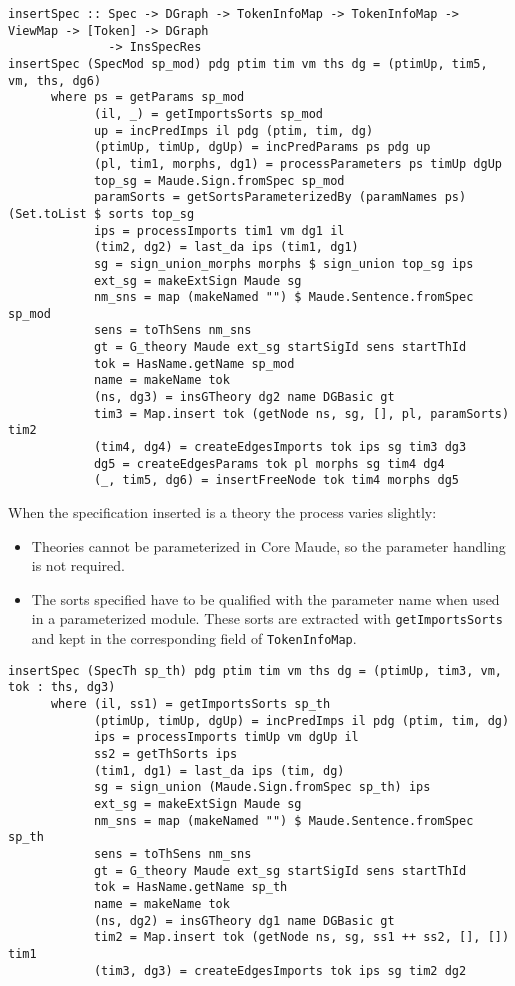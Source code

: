 {\codesize
\begin{verbatim}
insertSpec :: Spec -> DGraph -> TokenInfoMap -> TokenInfoMap -> ViewMap -> [Token] -> DGraph
              -> InsSpecRes
insertSpec (SpecMod sp_mod) pdg ptim tim vm ths dg = (ptimUp, tim5, vm, ths, dg6)
      where ps = getParams sp_mod
            (il, _) = getImportsSorts sp_mod
            up = incPredImps il pdg (ptim, tim, dg)
            (ptimUp, timUp, dgUp) = incPredParams ps pdg up
            (pl, tim1, morphs, dg1) = processParameters ps timUp dgUp
            top_sg = Maude.Sign.fromSpec sp_mod
            paramSorts = getSortsParameterizedBy (paramNames ps) (Set.toList $ sorts top_sg
            ips = processImports tim1 vm dg1 il
            (tim2, dg2) = last_da ips (tim1, dg1)
            sg = sign_union_morphs morphs $ sign_union top_sg ips
            ext_sg = makeExtSign Maude sg
            nm_sns = map (makeNamed "") $ Maude.Sentence.fromSpec sp_mod
            sens = toThSens nm_sns
            gt = G_theory Maude ext_sg startSigId sens startThId
            tok = HasName.getName sp_mod
            name = makeName tok
            (ns, dg3) = insGTheory dg2 name DGBasic gt
            tim3 = Map.insert tok (getNode ns, sg, [], pl, paramSorts) tim2
            (tim4, dg4) = createEdgesImports tok ips sg tim3 dg3
            dg5 = createEdgesParams tok pl morphs sg tim4 dg4
            (_, tim5, dg6) = insertFreeNode tok tim4 morphs dg5
\end{verbatim}
}

When the specification inserted is a theory the process varies slightly:

\begin{itemize}
\item Theories cannot be parameterized in Core Maude, so the parameter
handling is not required.
\item The sorts specified have to be qualified with the parameter
name when used in a parameterized module. These sorts are extracted
with \verb"getImportsSorts" and kept in the corresponding field of
\verb"TokenInfoMap".
\end{itemize}

{\codesize
\begin{verbatim}
insertSpec (SpecTh sp_th) pdg ptim tim vm ths dg = (ptimUp, tim3, vm, tok : ths, dg3)
      where (il, ss1) = getImportsSorts sp_th
            (ptimUp, timUp, dgUp) = incPredImps il pdg (ptim, tim, dg)
            ips = processImports timUp vm dgUp il
            ss2 = getThSorts ips
            (tim1, dg1) = last_da ips (tim, dg)
            sg = sign_union (Maude.Sign.fromSpec sp_th) ips
            ext_sg = makeExtSign Maude sg
            nm_sns = map (makeNamed "") $ Maude.Sentence.fromSpec sp_th
            sens = toThSens nm_sns
            gt = G_theory Maude ext_sg startSigId sens startThId
            tok = HasName.getName sp_th
            name = makeName tok
            (ns, dg2) = insGTheory dg1 name DGBasic gt
            tim2 = Map.insert tok (getNode ns, sg, ss1 ++ ss2, [], []) tim1
            (tim3, dg3) = createEdgesImports tok ips sg tim2 dg2
\end{verbatim}
}

